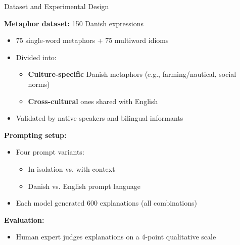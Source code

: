 \documentclass[xetex]{beamer}  %
\begin{document}
\begin{frame}{Dataset and Experimental Design}

  \textbf{Metaphor dataset:} 150 Danish expressions
  \begin{itemize}
  \item 75 single-word metaphors + 75 multiword idioms 
  \item Divided into:
    \begin{itemize}
    \item \textbf{Culture-specific} Danish metaphors (e.g., farming/nautical, social norms)
    \item \textbf{Cross-cultural} ones shared with English
    \end{itemize}
  \item Validated by native speakers and bilingual informants
  \end{itemize}

\medskip
\textbf{Prompting setup:}
\begin{itemize}
\item Four prompt variants:
  \begin{itemize}
  \item In isolation vs. with context
  \item Danish vs. English prompt language
  \end{itemize}
\item Each model generated 600 explanations (all combinations)
\end{itemize}

\medskip
\textbf{Evaluation:}
\begin{itemize}
  \item Human expert judges explanations on a 4-point qualitative scale
\end{itemize}

\end{frame}
\end{document}
